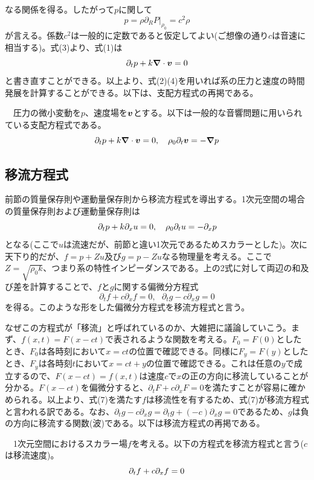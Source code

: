 \documentclass[dvipdfmx, 9pt, a4paper]{jsarticle}
\newcommand{\bm}[1]{{\mbox{\boldmath $#1$}}}
\begin{document}
なる関係を得る。したがって$p$に関して
\begin{equation}
p=\rho \partial_RP|_{\rho_0}=c^2\rho
\end{equation}
が言える。係数$c^2$は一般的に定数であると仮定してよい(ご想像の通り$c$は音速に相当する)。式(3)より、式(1)は
\begin{equation}
\partial_tp+k\bm \nabla \cdot \bm v=0
\end{equation}
と書き直すことができる。以上より、式(2)(4)を用いれば系の圧力と速度の時間発展を計算することができる。以下は、支配方程式の再掲である。
\begin{tcolorbox}[title=音響問題における支配方程式]
　圧力の微小変動を$p$、速度場を$\bm v$とする。以下は一般的な音響問題に用いられている支配方程式である。
\begin{equation}
\partial_tp+k\bm \nabla \cdot \bm v=0,~~~\rho_0\partial_t\bm v=-\bm \nabla p \notag
\end{equation}
\end{tcolorbox}

\subsection{移流方程式}
前節の質量保存則や運動量保存則から移流方程式を導出する。1次元空間の場合の質量保存則および運動量保存則は
\begin{equation}
\partial_tp+k\partial_xu=0,~~~\rho_0\partial_tu=-\partial_xp \notag
\end{equation}
となる(ここで$u$は流速だが、前節と違い1次元であるためスカラーとした)。次に天下り的だが、$f=p+Zu$及び$g=p-Zu$なる物理量を考える。ここで$Z=\sqrt{\rho_0k}$、つまり系の特性インピーダンスである。上の2式に対して両辺の和及び差を計算することで、$f$と$g$に関する偏微分方程式
\begin{equation}
\partial_tf+c\partial_xf=0,~~~\partial_tg-c\partial_xg=0
\end{equation}
を得る。このような形をした偏微分方程式を移流方程式と言う。\par
なぜこの方程式が「移流」と呼ばれているのか、大雑把に議論していこう。まず、$f(x, t)=F(x-ct)$で表されるような関数を考える。$F_0=F(0)$としたとき、$F_0$は各時刻において$x=ct$の位置で確認できる。同様に$F_y=F(y)$としたとき、$F_y$は各時刻$t$において$x=ct+y$の位置で確認できる。これは任意の$y$で成立するので、$F(x-ct)=f(x,t)$は速度$c$で$x$の正の方向に移流していることが分かる。$F(x-ct)$を偏微分すると、$\partial_tF+c\partial_xF=0$を満たすことが容易に確かめられる。以上より、式(7)を満たす$f$は移流性を有するため、式(7)が移流方程式と言われる訳である。なお、$\partial_tg-c\partial_xg=\partial_tg+(-c)\partial_xg=0$であるため、$g$は負の方向に移流する関数(波)である。以下は移流方程式の再掲である。
\begin{tcolorbox}[title=移流方程式]
　1次元空間におけるスカラー場$f$を考える。以下の方程式を移流方程式と言う($c$は移流速度)。
\begin{equation}
\partial_tf+c\partial_xf=0 \notag
\end{equation}
\end{tcolorbox}
\end{document}
